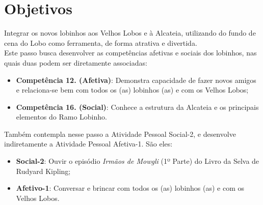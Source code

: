 \chapter[Objetivos]{Objetivos}
\label{chap:objetivos}
	Integrar os novos lobinhos aos Velhos Lobos e à Alcateia, utilizando do fundo de cena do Lobo como ferramenta, de forma atrativa e divertida.
	\\ \indent Este passo busca desenvolver as competências afetivas e sociais dos lobinhos, nas quais duas podem ser diretamente associadas:
	\begin{itemize}
		\item{\textbf{Competência 12. (Afetiva)}: Demonstra capacidade de fazer novos amigos e relaciona-se bem com todos os (as) lobinhos (as) e com os Velhos Lobos;}
		\item{\textbf{Competência 16. (Social)}: Conhece a estrutura da Alcateia e os principais elementos do Ramo Lobinho.}
	\end{itemize}
	\indent Também contempla nesse passo a Atividade Pessoal Social-2, e desenvolve indiretamente a Atividade Pessoal Afetiva-1. São eles:
	\begin{itemize}
		\item{\textbf{Social-2}: Ouvir o episódio \emph{Irmãos de Mowgli} (1º Parte) do Livro da Selva de Rudyard Kipling;}
		\item{\textbf{Afetivo-1}: Conversar e brincar com todos os (as) lobinhos (as) e com os Velhos Lobos.}
	\end{itemize}